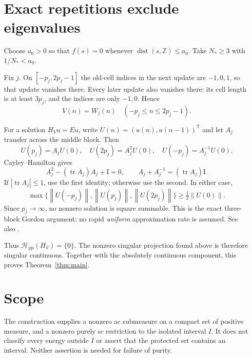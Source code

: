 \documentclass[11pt,a4paper]{article}
\numberwithin{equation}{section}
\theoremstyle{remark}
\newcommand{\Z}{\mathbb Z}
\newcommand{\Id}{\mathrm I}
\newcommand{\tr}{\operatorname{tr}}
\newcommand{\dist}{\operatorname{dist}}
\newcommand{\norm}[1]{\left\lVert #1\right\rVert}
\begin{document}
\section{Exact repetitions exclude eigenvalues}
Choose $a_0>0$ so that $f(s)=0$ whenever
$\dist(s,\Z)\le a_0$. Take $N_*\ge3$ with
$1/N_*<a_0$.

Fix $j$. On $[-p_j,2p_j-1]$ the old-cell indices
in the next update are $-1,0,1$, so that update
vanishes there. Every later update also vanishes
there: its cell length is at least $3p_j$, and
the indices are only $-1,0$. Hence
\begin{equation}\label{eq:exact}
V(n)=W_j(n)\quad(-p_j\le n\le2p_j-1).
\end{equation}

For a solution $H_Vu=Eu$, write
$U(n)=(u(n),u(n-1))^{\mathsf T}$ and let $A_j$
transfer across the middle block. Then
\[
U(p_j)=A_jU(0),\quad U(2p_j)=A_j^2U(0),\quad
U(-p_j)=A_j^{-1}U(0).
\]
Cayley--Hamilton gives
\[
A_j^2-(\tr A_j)A_j+\Id=0,\qquad
A_j+A_j^{-1}=(\tr A_j)\Id.
\]
If $|\tr A_j|\le1$, use the first identity; otherwise
use the second. In either case,
\[
\max\{\norm{U(-p_j)},\norm{U(p_j)},\norm{U(2p_j)}\}
\ge\tfrac12\norm{U(0)}.
\]
Since $p_j\to\infty$, no nonzero solution is square
summable. This is the exact three-block Gordon
argument; no rapid \emph{uniform} approximation rate
is assumed. See also \cite[Section~6.2]{DF}.

Thus $\mathcal H_{\mathrm{pp}}(H_V)=\{0\}$.
The nonzero singular projection found above is
therefore singular continuous. Together with the
absolutely continuous component, this proves
Theorem~\ref{thm:main}.

\section*{Scope}
The construction supplies a nonzero ac submeasure on
a compact set of positive measure, and a nonzero
purely sc restriction to the isolated interval $I$.
It does not classify every energy outside $I$ or
assert that the protected set contains an interval.
Neither assertion is needed for failure of purity.
\end{document}
